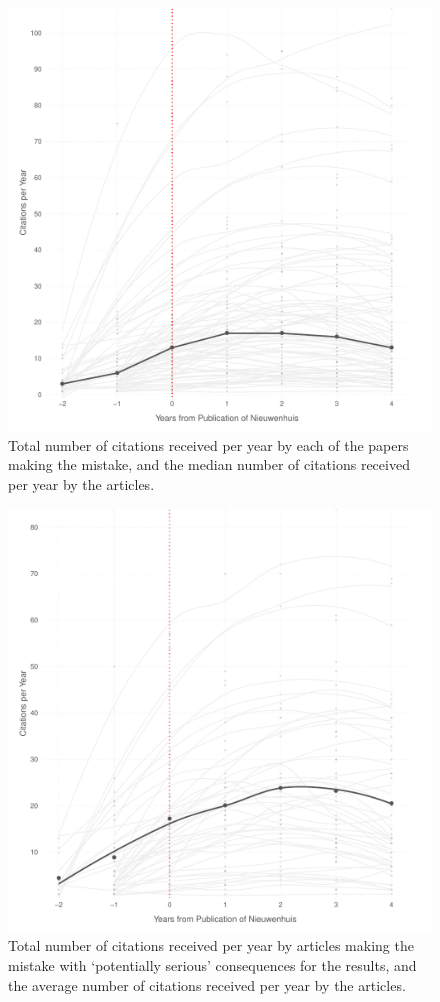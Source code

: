 \documentclass[12pt]{article}
\begin{document}
\begin{figure}[h]
\centering
\includegraphics[scale=.7]{../figs/nw_median_growth_curve.pdf}
\caption{Total number of citations received per year by each of the papers making the mistake, and the median number of citations received per year by the articles.}
\label{fig:median_niewenhuis}
\end{figure}

\clearpage
\begin{figure}[h]
\centering
\includegraphics[scale=.7]{../figs/serious_nw_growth_curve.pdf}
\caption{Total number of citations received per year by articles making the mistake with `potentially serious' consequences for the results, and the average number of citations received per year by the articles.}
\label{fig:serious_niewenhuis}
\end{figure}
\end{document}
